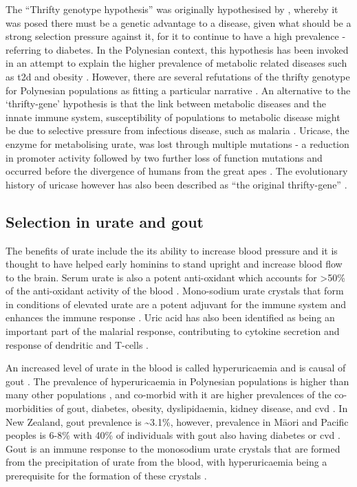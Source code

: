 \documentclass[]{report}
\newcommand{\tex}[1]{#1}
\begin{document}
The ``Thrifty genotype hypothesis'' was originally hypothesised by
\citet{Neel1962}, whereby it was posed there must be a genetic advantage
to a disease, given what should be a strong selection pressure against
it, for it to continue to have a high prevalence - referring to
diabetes. In the Polynesian context, this hypothesis has been invoked in
an attempt to explain the higher prevalence of metabolic related
diseases such as \gls{t2d} and obesity \citep{Myles2011, Minster2016}.
However, there are several refutations of the thrifty genotype for
Polynesian populations as fitting a particular narrative
\citep{Gosling2014, Gosling2015, Cadzow2016}. An alternative to the
`thrifty-gene' hypothesis is that the link between metabolic diseases
and the innate immune system, susceptibility of populations to metabolic
disease might be due to selective pressure from infectious disease, such
as malaria \citep{Gosling2015}. Uricase, the enzyme for metabolising
urate, was lost through multiple mutations - a reduction in promoter
activity followed by two further loss of function mutations and occurred
before the divergence of humans from the great apes \citep{Kratzer2014}.
The evolutionary history of uricase however has also been described as
``the original thrifty-gene'' \citep{Kratzer2014}.

\subsection{Selection in urate and
gout}\label{selection-in-urate-and-gout}

The benefits of urate include the its ability to increase blood pressure
and it is thought to have helped early hominins to stand upright
\citep{Watanabe2002} and increase blood flow to the brain. Serum urate
is also a potent anti-oxidant which accounts for \textgreater{}50\% of
the anti-oxidant activity of the blood
\citep{Glantzounis2005, Parmar2009}. Mono-sodium urate crystals that
form in conditions of elevated urate are a potent adjuvant for the
immune system and enhances the immune response
\citep{Ames1981, Opitz2009}. Uric acid has also been identified as being
an important part of the malarial response, contributing to cytokine
secretion and response of dendritic and T-cells
\citep{GallegoDelgado2014}.

An increased level of urate in the blood is called hyperuricaemia and is
causal of gout \citep{Choi2005a}. The prevalence of hyperuricaemia in
Polynesian populations is higher than many other populations
\citep{Gosling2014}, and co-morbid with it are higher prevalences of the
co-morbidities of gout, diabetes, obesity, dyslipidaemia, kidney
disease, and \gls{cvd} \citep{Winnard2013}. In New Zealand, gout
prevalence is \textasciitilde{}3.1\%, however, prevalence in
M\tex{\={a}}ori and Pacific peoples is 6-8\% with 40\% of individuals
with gout also having diabetes or \gls{cvd} \citep{Winnard2013}. Gout is
an immune response to the monosodium urate crystals that are formed from
the precipitation of urate from the blood, with hyperuricaemia being a
prerequisite for the formation of these crystals \citep{Merriman2011a}.
\end{document}
